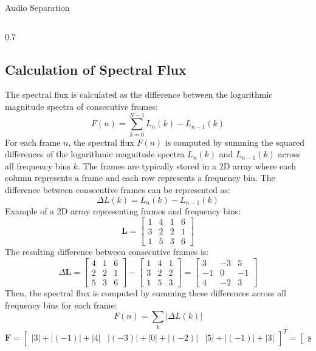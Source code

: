 \documentclass[aspectratio=169]{beamer}
\begin{document}
\begin{frame}{Audio Separation}
\begin{columns}[T]
\begin{column}{0.7\textwidth}
     \subsection{Calculation of Spectral Flux}
        The spectral flux is calculated as the difference between the logarithmic magnitude spectra of consecutive frames:
        \begin{equation}
            F(n) = \sum_{k=0}^{N-1} L_n(k) - L_{n-1}(k)
        \end{equation}
        For each frame $n$, the spectral flux $F(n)$ is computed by summing the squared differences of the logarithmic magnitude spectra $L_n(k)$ and $L_{n-1}(k)$ across all frequency bins $k$.
        The frames are typically stored in a 2D array where each column represents a frame and each row represents a frequency bin. The difference between consecutive frames can be represented as:
        \begin{equation}
            \Delta L(k) = L_n(k) - L_{n-1}(k)
        \end{equation}
        Example of a 2D array representing frames and frequency bins:
        \[
        \mathbf{L} =
        \begin{bmatrix}
                1 & 4 & 1 & 6 \\
                3 & 2 & 2 & 1 \\
                1 & 5 & 3 & 6
        \end{bmatrix}
        \]
        The resulting difference between consecutive frames is:
        \[
        \Delta \mathbf{L} =
        \begin{bmatrix}
                4 & 1 & 6 \\
                2 & 2 & 1 \\
                5 & 3 & 6
        \end{bmatrix} 
        -
        \begin{bmatrix}
                1 & 4 & 1 \\
                3 & 2 & 2 \\
                1 & 5 & 3
        \end{bmatrix} 
        =
        \begin{bmatrix}
                3 & -3 & 5 \\
                -1 & 0 & -1 \\
                4 & -2 & 3
        \end{bmatrix}
            \]
        Then, the spectral flux is computed by summing these differences across all frequency bins for each frame:
        \begin{equation}
            F(n) = \sum_{k} |\Delta L(k)|
        \end{equation}
        \[
        \mathbf{F} =
        \begin{bmatrix}
            |3| + |(-1)| + |4| &
            |(-3)| + |0| + |(-2)| &
            |5| + |(-1)| + |3|
        \end{bmatrix}^T
        =
        \begin{bmatrix}
            8 & 5 & 9
            \end{bmatrix}^T
            \]


\end{column}
\end{columns}
\end{frame}
\end{document}
